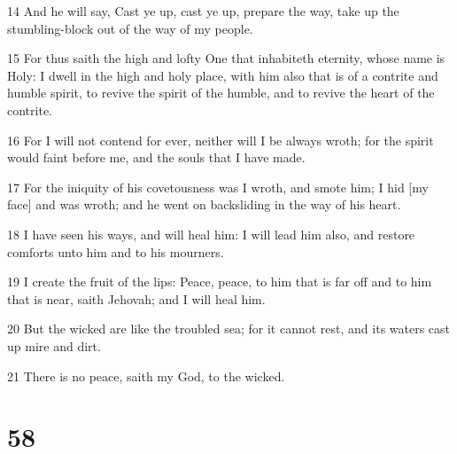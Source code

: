 \par 14 And he will say, Cast ye up, cast ye up, prepare the way, take up the stumbling-block out of the way of my people.
\par 15 For thus saith the high and lofty One that inhabiteth eternity, whose name is Holy: I dwell in the high and holy place, with him also that is of a contrite and humble spirit, to revive the spirit of the humble, and to revive the heart of the contrite.
\par 16 For I will not contend for ever, neither will I be always wroth; for the spirit would faint before me, and the souls that I have made.
\par 17 For the iniquity of his covetousness was I wroth, and smote him; I hid [my face] and was wroth; and he went on backsliding in the way of his heart.
\par 18 I have seen his ways, and will heal him: I will lead him also, and restore comforts unto him and to his mourners.
\par 19 I create the fruit of the lips: Peace, peace, to him that is far off and to him that is near, saith Jehovah; and I will heal him.
\par 20 But the wicked are like the troubled sea; for it cannot rest, and its waters cast up mire and dirt.
\par 21 There is no peace, saith my God, to the wicked.

\chapter{58}

